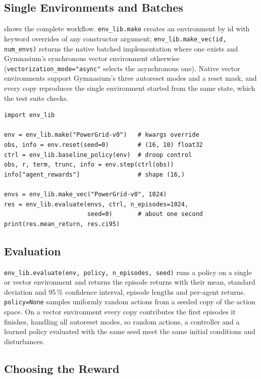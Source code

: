 \documentclass{article}
\newcommand{\code}[1]{\texttt{#1}}
\begin{document}
\subsection{Single Environments and Batches}

 shows the complete workflow. \code{env\_lib.make} creates an
environment by id with keyword overrides of any constructor argument;
\code{env\_lib.make\_vec(id, num\_envs)} returns the native batched
implementation where one exists and Gymnasium's synchronous vector
environment otherwise (\code{vectorization\_mode="async"} selects the
asynchronous one). Native vector environments support Gymnasium's three
autoreset modes and a reset mask, and every copy reproduces the single
environment started from the same state, which the test suite checks.

\begin{lstlisting}[caption={Create, control, batch and evaluate.},label={lst:basic},captionpos=b,float=t]
import env_lib

env = env_lib.make("PowerGrid-v0")   # kwargs override
obs, info = env.reset(seed=0)        # (16, 10) float32
ctrl = env_lib.baseline_policy(env)  # droop control
obs, r, term, trunc, info = env.step(ctrl(obs))
info["agent_rewards"]                # shape (16,)

envs = env_lib.make_vec("PowerGrid-v0", 1024)
res = env_lib.evaluate(envs, ctrl, n_episodes=1024,
                       seed=0)       # about one second
print(res.mean_return, res.ci95)
\end{lstlisting}

\subsection{Evaluation}

\code{env\_lib.evaluate(env, policy, n\_episodes, seed)} runs a policy on a
single or vector environment and returns the episode returns with their mean,
standard deviation and 95\,\% confidence interval, episode lengths and
per-agent returns. \code{policy=None} samples uniformly random actions from a
seeded copy of the action space. On a vector environment every copy
contributes the first episodes it finishes, handling all autoreset modes, so
random actions, a controller and a learned policy evaluated with the same seed
meet the same initial conditions and disturbances.

\subsection{Choosing the Reward}\label{sec:rewards}
\end{document}
